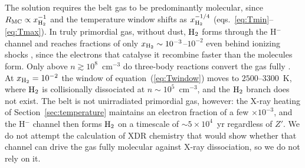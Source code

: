 \documentclass[twocolumn,pdftex]{aastex701}
\newcommand{\xhh}{x_{\rm H_2}}
\newcommand{\Zp}{Z'}
\newcommand{\Htwo}{{\rm H_2}}
\begin{document}
The solution requires the belt gas to be predominantly molecular, since $R_{\rm MC}\propto\xhh^{-1}$ and the temperature window shifts as $\xhh^{-1/4}$ (eqs.~\ref{eq:Tmin}--\ref{eq:Tmax}). In truly primordial gas, without dust, $\Htwo$ forms through the H$^{-}$ channel and reaches fractions of only $\xhh\sim10^{-3}$--$10^{-2}$ even behind ionizing shocks \citep{Shapiro:1987a}, since the electrons that catalyse it recombine faster than the molecules form. Only above $n\gtrsim10^{8}$~cm$^{-3}$ do three-body reactions convert the gas fully \citep{Palla:1983a}. At $\xhh = 10^{-2}$ the window of equation~(\ref{eq:Twindow}) moves to $2500$--$3300$~K, where $\Htwo$ is collisionally dissociated at $n\sim10^{5}$~cm$^{-3}$, and the $\Htwo$ branch does not exist. The belt is not unirradiated primordial gas, however: the X-ray heating of Section~\ref{sec:temperature} maintains an electron fraction of a few $\times10^{-3}$, and the H$^{-}$ channel then forms $\Htwo$ on a timescale of $\sim5\times10^{4}$~yr regardless of $\Zp$. We do not attempt the calculation of XDR chemistry that would show whether that channel can drive the gas fully molecular against X-ray dissociation, so we do not rely on it.
\end{document}
